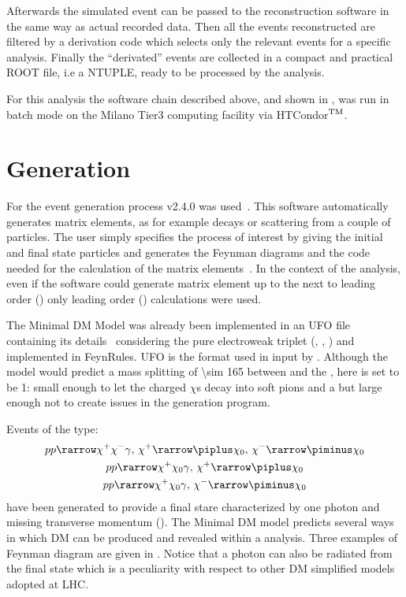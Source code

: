 Afterwards the simulated event can be passed to the reconstruction software in the same way as actual recorded data. Then all the events reconstructed are filtered by a derivation code which selects only the  relevant events for a specific analysis. Finally the ``derivated'' events are collected in a compact and practical ROOT file, i.e a NTUPLE, ready to be processed by the analysis.

For this analysis the software chain described above, and shown in \Fig{\ref{fig:chain}}, was run in batch mode on the Milano Tier3 computing facility via HTCondor$^{\textup{TM}}$.



\section{Generation}

For the event generation process \MGMCatNLO v2.4.0 was used~\cite{madgraph}. This software automatically generates matrix elements, as for example decays or scattering from a couple of particles. The user simply specifies the process of interest by giving the initial and final state particles and \MADGRAPH generates the Feynman diagrams and the code needed for the calculation of the matrix elements~\cite{Pottgen:2016807}. In the context of the analysis, even if the software could generate matrix element up to the next to leading order (\NLO) only leading order (\LO) calculations were used.

The Minimal DM Model was already been implemented in an UFO file containing its details~\cite{mperego} considering the pure electroweak triplet (\chip\!, \chizero\!, \chim\!) and implemented in FeynRules. UFO is the format used in input by \MADGRAPH. Although the model would predict a mass splitting of \SI{\sim 165}{\mev} between \chipm and the \chizero, here is set to be \SI{1}{\gev}: small enough to let the charged $\chi$s decay into soft pions and a \chizero but large enough not to create issues in the generation program. 

Events of the type: 
\begin{gather*}
p p \rarrow \chi^+ \chi^- \gamma,\, \chi^+ \rarrow \piplus \chi_0,\, \chi^- \rarrow \piminus \chi_0\\
p p \rarrow \chi^+ \chi_0 \gamma,\, \chi^+ \rarrow \piplus \chi_0\\
p p \rarrow \chi^+ \chi_0 \gamma,\, \chi^- \rarrow \piminus \chi_0
\end{gather*}
have been generated to provide a final stare characterized by one photon and missing transverse momentum (\met). The Minimal DM model predicts several ways in which DM can be produced and revealed within a \mph analysis. Three examples of Feynman diagram are given in \Fig{\ref{fig:feynman}}. Notice that a photon can also be radiated from the final state which is a peculiarity with respect to other DM simplified models adopted at LHC.

